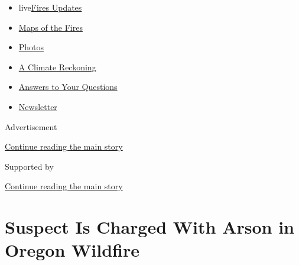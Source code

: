 \begin{itemize}
\tightlist
\item
  live\href{https://www.nytimes3xbfgragh.onion/2020/09/12/us/wildfires-live-updates.html?name=styln-california-wildfires\&region=TOP_BANNER\&block=storyline_menu_recirc\&action=click\&pgtype=Article\&impression_id=d7e52920-f52b-11ea-b1f6-7dcd7185e0b5\&variant=undefined}{Fires
  Updates}
\item
  \href{https://www.nytimes3xbfgragh.onion/interactive/2020/us/fires-map-tracker.html?name=styln-california-wildfires\&region=TOP_BANNER\&block=storyline_menu_recirc\&action=click\&pgtype=Article\&impression_id=d7e52921-f52b-11ea-b1f6-7dcd7185e0b5\&variant=undefined}{Maps
  of the Fires}
\item
  \href{https://www.nytimes3xbfgragh.onion/article/wildfires-photos-california-oregon-washington-state.html?name=styln-california-wildfires\&region=TOP_BANNER\&block=storyline_menu_recirc\&action=click\&pgtype=Article\&impression_id=d7e52922-f52b-11ea-b1f6-7dcd7185e0b5\&variant=undefined}{Photos}
\item
  \href{https://www.nytimes3xbfgragh.onion/2020/09/10/us/climate-change-california-wildfires.html?name=styln-california-wildfires\&region=TOP_BANNER\&block=storyline_menu_recirc\&action=click\&pgtype=Article\&impression_id=d7e52923-f52b-11ea-b1f6-7dcd7185e0b5\&variant=undefined}{A
  Climate Reckoning}
\item
  \href{https://www.nytimes3xbfgragh.onion/article/wildfires-california-oregon-washington.html?name=styln-california-wildfires\&region=TOP_BANNER\&block=storyline_menu_recirc\&action=click\&pgtype=Article\&impression_id=d7e52924-f52b-11ea-b1f6-7dcd7185e0b5\&variant=undefined}{Answers
  to Your Questions}
\item
  \href{https://www.nytimes3xbfgragh.onion/2020/09/09/us/california-wildfires.html?name=styln-california-wildfires\&region=TOP_BANNER\&block=storyline_menu_recirc\&action=click\&pgtype=Article\&impression_id=d7e52925-f52b-11ea-b1f6-7dcd7185e0b5\&variant=undefined}{Newsletter}
\end{itemize}

Advertisement

\protect\hyperlink{after-top}{Continue reading the main story}

Supported by

\protect\hyperlink{after-sponsor}{Continue reading the main story}

\hypertarget{suspect-is-charged-with-arson-in-oregon-wildfire}{%
\section{Suspect Is Charged With Arson in Oregon
Wildfire}\label{suspect-is-charged-with-arson-in-oregon-wildfire}}

